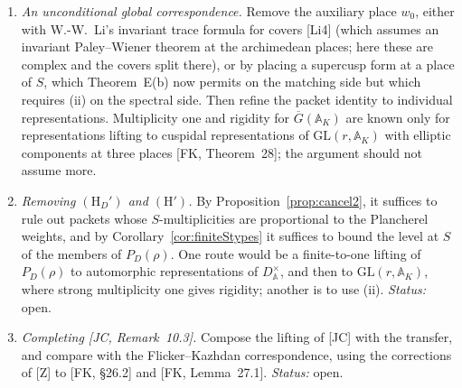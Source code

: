 \documentclass[12pt]{article}
\newcommand{\ov}[1]{\overline{#1}}
\newcommand{\A}{\mathbb{A}}
\newcommand{\GL}{\mathrm{GL}}
\newcommand{\Gb}{\ov{G}}
\newcommand{\GDb}{\ov{G}_D}
\newcommand{\pib}{\ov{\pi}}
\newcommand{\Pv}{\textbf{[P]}}
\theoremstyle{plain}
\theoremstyle{definition}
\begin{document}
\begin{enumerate}[label=(\roman*),start=2]
\emph{Status after Part~III.} Part~III constructs a unitary transform $L_D$ between ordinary invariant class functions on $D_v^\times$ and genuine ones on $\GDb(K_v)$, with constant $b_D=|n|_{K_v}^{-(r-1)/2}$, and proves that it bijects irreducible characters, preserving dimensions, when the residue characteristic of $v$ is prime to $n$ (Part~III, Theorem~7.6). Zou's constant in the Flicker--Kazhdan relation [Z, (3.2)] equals $b_D$ for the cover with parameter $c_v$, because $\gcd(n,2rc_v+r-1)=n$. Composing $L_D$ with [DKV] and [Z, Proposition~3.6] therefore proves the bijection and the character relation above at every $v\in S$ prime to $n$ \Pv\ (Part~I, Remark~8.1, and Part~III, Corollary~7.8; subject to the hypotheses of [FK, Theorem~26.1], used by Zou). At places dividing $n$ the relation is equivalent to integrality of $L_D$, which is open. The formal-degree statement is consistent with these results. For the measures of Definition~\ref{def:measures}, integrality gives $d(\pib_{D,v})=c_D\,d(\pi_v)$ with $c_D=|n|_{K_v}^{-(r^2-1)/2}$ ($c_D=1$ at tame places). Zou's relation near the identity, together with Corollaries~\ref{cor:germexp} and~\ref{cor:trivgerm}, gives $d(\pib_v)=c_D\,d(\pi_v)$, provided one has the genuine analog of the relation between the leading germ and the formal degree. Here $\pi_v$ is the common linear partner.
\item \emph{An unconditional global correspondence.} Remove the auxiliary place $w_0$, either with W.-W.~Li's invariant trace formula for covers [Li4] (which assumes an invariant Paley--Wiener theorem at the archimedean places; here these are complex and the covers split there), or by placing a supercusp form at a place of $S$, which Theorem~E(b) now permits on the matching side but which requires (ii) on the spectral side. Then refine the packet identity to individual representations. Multiplicity one and rigidity for $\Gb(\A_K)$ are known only for representations lifting to cuspidal representations of $\GL(r,\A_K)$ with elliptic components at three places [FK, Theorem~28]; the argument should not assume more.
\item \emph{Removing $(\mathrm H_D')$ and $(\mathrm H')$.} By Proposition~\ref{prop:cancel2}, it suffices to rule out packets whose $S$-multiplicities are proportional to the Plancherel weights, and by Corollary~\ref{cor:finiteStypes} it suffices to bound the level at $S$ of the members of $P_D(\rho)$. One route would be a finite-to-one lifting of $P_D(\rho)$ to automorphic representations of $D^\times_{\A}$, and then to $\GL(r,\A_K)$, where strong multiplicity one gives rigidity; another is to use (ii). \emph{Status:} open.
\item \emph{Completing [JC, Remark~10.3].} Compose the lifting of [JC] with the transfer, and compare with the Flicker--Kazhdan correspondence, using the corrections of [Z] to [FK, \S26.2] and [FK, Lemma~27.1]. \emph{Status:} open.
\end{enumerate}
\end{document}
